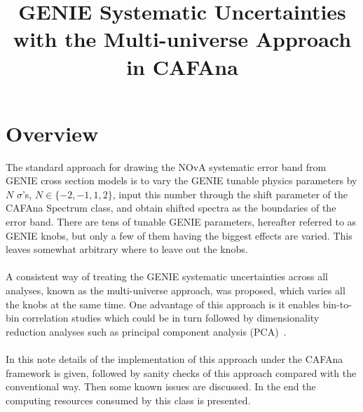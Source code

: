 \documentclass[12pt,a4paper,final]{iopart}
\begin{document}
\title{GENIE Systematic Uncertainties with the Multi-universe Approach in CAFAna}

\section{Overview}
The standard approach for drawing the NOvA systematic error band from GENIE cross section models is to vary the GENIE tunable physics parameters by $N$ $\sigma$'s, $N\in\{-2,-1,1,2\}$, input this number through the shift parameter of the CAFAna Spectrum class, and obtain shifted spectra as the boundaries of the error band. There are tens of tunable GENIE parameters, hereafter referred to as GENIE knobs, but only a few of them having the biggest effects are varied. This leaves somewhat arbitrary where to leave out the knobs.\\\\
A consistent way of treating the GENIE systematic uncertainties across all analyses, known as the multi-universe approach, was proposed, which varies all the knobs at the same time. One advantage of this approach is it enables bin-to-bin correlation studies which could be in turn followed by dimensionality reduction analyses such as principal component analysis (PCA)~\cite{ref1}.\\\\
In this note details of the implementation of this approach under the CAFAna framework is given, followed by sanity checks of this approach compared with the conventional way. Then some known issues are discussed. In the end the computing resources consumed by this class is presented.
\end{document}
